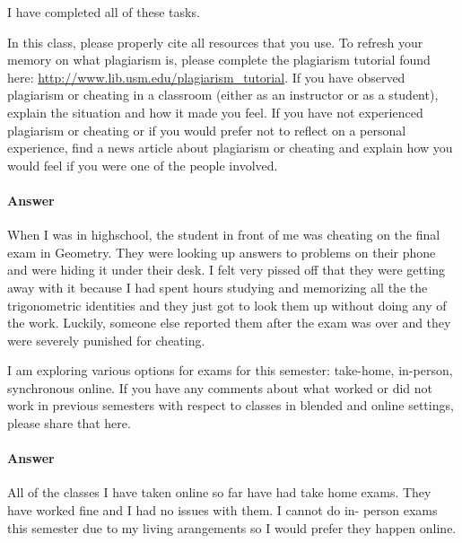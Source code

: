\documentclass{article}
\begin{document}
I have completed all of these tasks.



In this class, please properly cite all resources that you use.  To refresh your
memory on what plagiarism is, please complete the plagiarism tutorial found
here: \url{http://www.lib.usm.edu/plagiarism_tutorial}.  If you have observed
plagiarism or cheating in a classroom (either as an instructor or as a student),
explain the situation and how it made you feel.  If you have not experienced
plagiarism or cheating or if you would prefer not to reflect on a personal
experience, find a news article about plagiarism or cheating and explain how you
would feel if you were one of the people involved.

\paragraph{Answer}

When I was in highschool, the student in front of me was cheating on the final exam in Geometry. They were  looking up answers to problems on their phone and were hiding it under their desk. I  felt very pissed off that they were getting away with it because I had spent hours studying and memorizing all the the trigonometric identities and they just got to look them up without doing any of the work. Luckily, someone else reported them after the exam was over and they were severely punished for cheating. 


I am exploring various options for exams for this semester: take-home,
in-person, synchronous online.  If you have any comments about what worked or
did not work in previous semesters with respect to classes in blended and online
settings, please share that here.

\paragraph{Answer}


All of the classes I have taken online so far have had take home exams. They have worked fine and I had no issues with them. I cannot do in- person exams this semester due to my living arangements so I would prefer they happen online.
\end{document}
